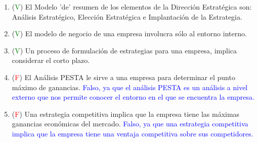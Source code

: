 \documentclass{templateNote}
\begin{document}
\begin{enumerate}
    \item (\textcolor{green}{V}) El Modelo 'de' resumen de los elementos de la Dirección Estratégica son: Análisis Estratégico, Elección Estratégica e Implantación de la Estrategia.
    
    \item (\textcolor{green}{V}) El modelo de negocio de una empresa involucra sólo al entorno interno.
    
    \item (\textcolor{green}{V}) Un proceso de formulación de estrategias para una empresa, implica considerar el corto plazo.
    
    \item (\textcolor{red}{F}) El Análisis PESTA le sirve a una empresa para determinar el punto máximo de ganancias.
    \textcolor{blue}{
        Falso, ya que el análisis PESTA es un análisis a nivel externo que nos permite conocer el entorno en el que se encuentra la empresa.
    }
    
    \item (\textcolor{red}{F}) Una estrategia competitiva implica que la empresa tiene las máximas ganancias económicas del mercado.\newline
    \textcolor{blue}{
        Falso, ya que una estrategia competitiva implica que la empresa tiene una ventaja competitiva sobre sus competidores.
    }
\end{enumerate}

\newpage
\end{document}
